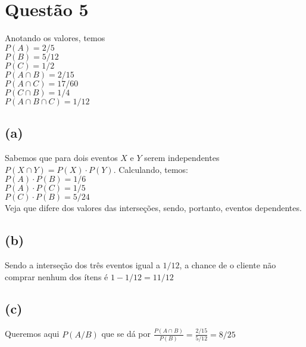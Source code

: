 \documentclass{article}
\begin{document}
\section*{Questão 5}
Anotando os valores, temos
\vspace{\baselineskip}\\
$P(A) = 2/5$
\vspace{\baselineskip}\\
$P(B) = 5/12$
\vspace{\baselineskip}\\
$P(C) = 1/2$
\vspace{\baselineskip}\\
$P(A \cap B) = 2/15$
\vspace{\baselineskip}\\
$P(A \cap C) = 17/60$
\vspace{\baselineskip}\\
$P(C \cap B) = 1/4$
\vspace{\baselineskip}\\
$P(A \cap B \cap C) = 1/12$

\subsection*{(a)}
Sabemos que para dois eventos $X$ e $Y$ serem independentes $P(X \cap Y) = P(X) \cdot P(Y)$. Calculando, temos:
\vspace{\baselineskip}\\
$P(A) \cdot P(B) = 1 / 6$
\vspace{\baselineskip}\\
$P(A) \cdot P(C) = 1 / 5$ 
\vspace{\baselineskip}\\
$P(C) \cdot P(B) = 5 / 24$
\vspace{\baselineskip}\\
Veja que difere dos valores das interseções, sendo, portanto, eventos dependentes.

\subsection*{(b)}
Sendo a interseção dos três eventos igual a $1 / 12$, a chance de o cliente não comprar nenhum dos ítens é $1 - 1/12 = 11/12$

\subsection*{(c)}
Queremos aqui $P(A / B)$ que se dá por $\frac{P(A \cap B)}{P(B)} = \frac{2 / 15}{5 / 12} = 8 / 25$
\end{document}
